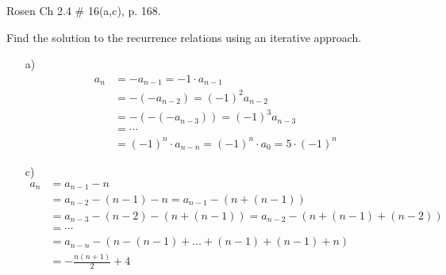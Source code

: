\documentclass[11pt]{exam}
\begin{document}
\begin{questions}
\question[6] Rosen Ch 2.4 \# 16(a,c), p. 168.
\begin{solution}
Find the solution to the recurrence relations using an iterative approach.
\begin{itemize}
  \setlength{\itemsep}{1pt}
  \setlength{\parskip}{0pt}
  \setlength{\parsep}{0pt}
    \item[a)]
    \vskip -0.1in \begin{align*}
        a_n &= -a_{n-1} = -1\cdot a_{n-1} \\
          &= -(-a_{n-2}) = (-1)^2a_{n-2} \\
          &= -(-(-a_{n-3})) = (-1)^3a_{n-3} \\
          &= \cdots \\
          &= (-1)^n\cdot a_{n-n} = (-1)^n\cdot a_{0} = 5\cdot(-1)^n
    \end{align*}
    \item[c)]
    \vskip -0.1in \begin{align*}
        a_n &= a_{n-1} - n \\
         &= a_{n-2} -(n-1) - n = a_{n-1} - (n + (n-1)) \\
         &= a_{n-3} -(n-2) - (n + (n-1)) = a_{n-2} - (n + (n-1) + (n-2)) \\
         &= \cdots \\
         &= a_{n-n} -(n - (n-1) + \ldots + (n-1) + (n-1) + n) \\
         &= -\frac{n(n+1)}{2} + 4
    \end{align*}
\end{itemize}
\end{solution}


\end{questions}
\end{document}

